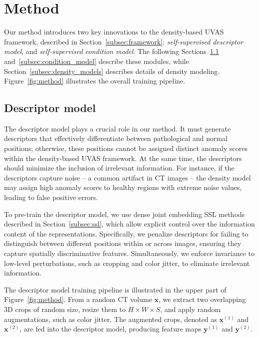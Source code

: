 
\section{Method}
\label{sec:method}

Our method introduces two key innovations to the density-based UVAS framework, described in Section~\ref{subsec:framework}: \emph{self-supervised descriptor model}, and \emph{self-supervised condition model}. The following Sections~\ref{subsec:descriptor_model} and~\ref{subsec:condition_model} describe these modules, while Section~\ref{subsec:density_models} describes details of density modeling. Figure~\ref{fig:method} illustrates the overall training pipeline.



\subsection{Descriptor model}
\label{subsec:descriptor_model}

The descriptor model plays a crucial role in our method. It must generate descriptors that effectively differentiate between pathological and normal positions; otherwise, these positions cannot be assigned distinct anomaly scores within the density-based UVAS framework. At the same time, the descriptors should minimize the inclusion of irrelevant information. For instance, if the descriptors capture noise -- a common artifact in CT images -- the density model may assign high anomaly scores to healthy regions with extreme noise values, leading to false positive errors.

To pre-train the descriptor model, we use dense joint embedding SSL methods described in Section~\ref{subsec:ssl}, which allow explicit control over the information content of the representations. Specifically, we penalize descriptors for failing to distinguish between different positions within or across images, ensuring they capture spatially discriminative features. Simultaneously, we enforce invariance to low-level perturbations, such as cropping and color jitter, to eliminate irrelevant information.

The descriptor model training pipeline is illustrated in the upper part of Figure~\ref{fig:method}. From a random CT volume \(\mathbf{x}\), we extract two overlapping 3D crops of random size, resize them to \({H \times W \times S}\), and apply random augmentations, such as color jitter. The augmented crops, denoted as \(\mathbf{x}^{(1)}\) and \(\mathbf{x}^{(2)}\), are fed into the descriptor model, producing feature maps \(\mathbf{y}^{(1)}\) and \(\mathbf{y}^{(2)}\).

